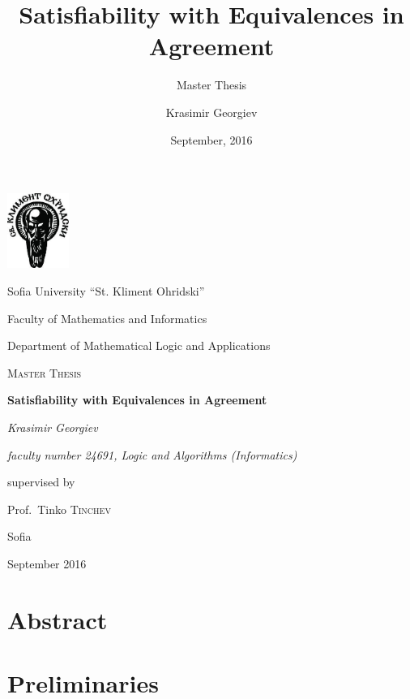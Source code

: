 \documentclass{scrbook}
\begin{document}
\frontmatter
\date{September, 2016}
\title{Satisfiability with Equivalences in Agreement}
\subtitle{Master Thesis}
\author{Krasimir Georgiev} 

\begin{titlepage}
  \centering
  \includegraphics[width=0.15\textwidth]{su_logo_imagelarge.jpg}\par\vspace{1cm}
  {\Large Sofia University ``St. Kliment Ohridski'' \par
  Faculty of Mathematics and Informatics \par
  Department of Mathematical Logic and Applications}
  
  \vspace{1cm}
  {\scshape\LARGE Master Thesis\par}
  \vspace{1.5cm}
  {\huge{\bfseries \textsf{Satisfiability with Equivalences in
  Agreement}\par}}
  \vspace{2cm}
  {\Large\itshape Krasimir Georgiev\par}
  \vspace{0.2cm}
  {\itshape faculty number 24691, Logic and Algorithms (Informatics)}
  \vfill
  {\large supervised by\par
  Prof.~Tinko \textsc{Tinchev}}

  \vfill

  {\large Sofia\par September 2016\par}
\end{titlepage}

\tableofcontents

\printglossary[style=mcolindex]

\chapter{Abstract}


\mainmatter
\chapter{Preliminaries}\label{ch:intro}











\end{document}
